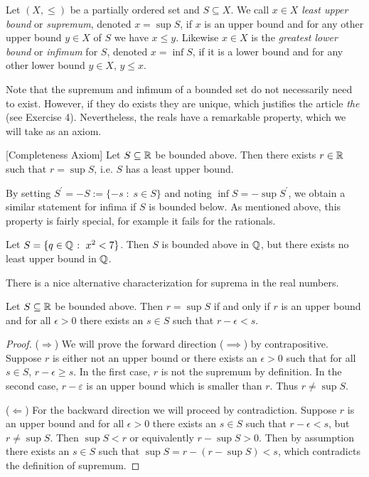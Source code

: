\documentclass{article}
\begin{document}
\begin{definition}%
Let $(X,\leq)$ be a partially ordered set and $S\subseteq X$. We call $x\in X$ \emph{least upper bound} or \emph{supremum}, denoted $x= \sup S$, if $x$ is an upper bound and for any other upper bound $y\in X$ of $S$ we have $x\leq y$. Likewise $x\in X$ is the \emph{greatest lower bound} or \emph{infimum} for $S$, denoted $x= \inf S$, if it is a lower bound and for any other lower bound $y\in X$, $y\leq x$.
\end{definition}

Note that the supremum and infimum of a bounded set do not necessarily need to exist. However, if they do exists they are unique, which justifies the article \emph{the} (see Exercise 4). Nevertheless, the reals have a remarkable property, which we will take as an axiom.

\begin{axiom}\label{ax: completeness}[Completeness Axiom]
Let $S\subseteq {\mathbb{R}}$ be bounded above. Then there exists $r\in {\mathbb{R}}$ such that $r= \sup S$, i.e. $S$ has a least upper bound. 
\end{axiom}

By setting $S^\prime = -S:= \{ -s \; \colon \; s\in S\}$ and noting $\inf S = - \sup S^\prime$, we obtain a similar statement for infima if $S$ is bounded below. As mentioned above, this property is fairly special, for example it fails for the rationals.

\begin{example}
Let $S= \{q \in {\mathbb{Q}} \; \colon \; x^2 < 7 \}$. Then $S$ is bounded above in ${\mathbb{Q}}$, but there exists no least upper bound in ${\mathbb{Q}}$.
\end{example}

There is a nice alternative characterization for suprema in the real numbers. 

\begin{proposition}
 Let $S\subseteq {\mathbb{R}}$ be bounded above. Then $r= \sup S$ if and only if $r$ is an upper bound and for all $\epsilon>0$ there exists an $s\in S$ such that $r-\epsilon <s$. 
\end{proposition}

\begin{proof}
($\Rightarrow$) We will prove the forward direction ($\implies$) by contrapositive. Suppose $r$ is either not an upper bound or there exists an $\epsilon>0$ such that for all $s\in S$, $r-\epsilon \geq s$. In the first case, $r$ is not the supremum by definition. In the second case, $r-\varepsilon$ is an upper bound which is smaller than $r$. Thus $r\neq \sup S$. 

($\Leftarrow$) For the backward direction we will proceed by contradiction. Suppose $r$ is an upper bound and for all $\epsilon>0$ there exists an $s\in S$ such that $r-\epsilon <s$, but $r\neq \sup S$. Then $\sup S < r$ or equivalently $r-\sup S>0$. Then by assumption there exists an $s\in S$ such that $\sup S = r-(r-\sup S)<s$, which contradicts the definition of supremum.
\end{proof}
\end{document}
